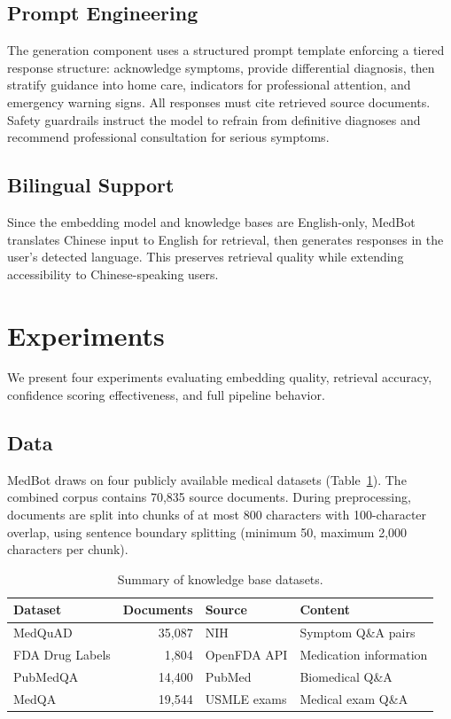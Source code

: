 \documentclass[11pt,a4paper]{article}
\begin{document}
\subsection{Prompt Engineering}

The generation component uses a structured prompt template enforcing a tiered response structure: acknowledge symptoms, provide differential diagnosis, then stratify guidance into home care, indicators for professional attention, and emergency warning signs. All responses must cite retrieved source documents. Safety guardrails instruct the model to refrain from definitive diagnoses and recommend professional consultation for serious symptoms.

\subsection{Bilingual Support}

Since the embedding model and knowledge bases are English-only, MedBot translates Chinese input to English for retrieval, then generates responses in the user's detected language. This preserves retrieval quality while extending accessibility to Chinese-speaking users.

\section{Experiments}

We present four experiments evaluating embedding quality, retrieval accuracy, confidence scoring effectiveness, and full pipeline behavior.

\subsection{Data}

MedBot draws on four publicly available medical datasets (Table~\ref{tab:data}). The combined corpus contains 70,835 source documents. During preprocessing, documents are split into chunks of at most 800 characters with 100-character overlap, using sentence boundary splitting (minimum 50, maximum 2,000 characters per chunk).

\begin{table}[t]
\centering
\caption{Summary of knowledge base datasets.}
\label{tab:data}
\begin{tabular}{@{}lrll@{}}
\toprule
\textbf{Dataset} & \textbf{Documents} & \textbf{Source} & \textbf{Content} \\
\midrule
MedQuAD         & 35,087 & NIH         & Symptom Q\&A pairs \\
FDA Drug Labels & 1,804  & OpenFDA API & Medication information \\
PubMedQA        & 14,400 & PubMed      & Biomedical Q\&A \\
MedQA           & 19,544 & USMLE exams & Medical exam Q\&A \\
\bottomrule
\end{tabular}
\end{table}
\end{document}
